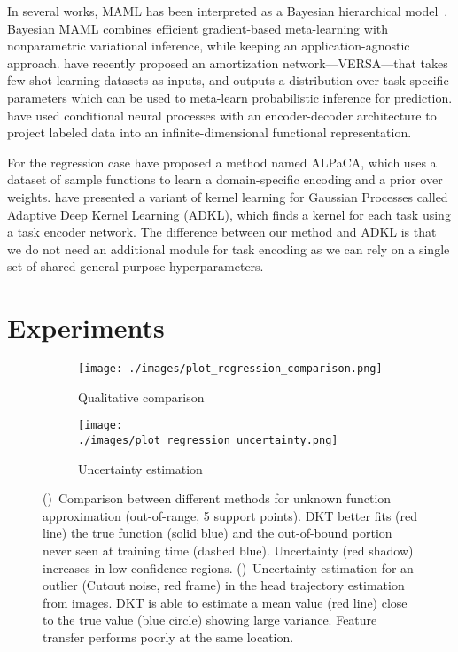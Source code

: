 \documentclass{article}
\begin{document}
In several works, MAML has been interpreted as a Bayesian hierarchical model~\citep{finn2018probabilistic, grant2018recasting, jerfel2019reconciling}. Bayesian MAML \citep{yoon2018bayesian} combines efficient gradient-based meta-learning with nonparametric variational inference, while keeping an application-agnostic approach. \citet{gordon2019meta} have recently proposed an amortization network---VERSA---that takes few-shot learning datasets as inputs, and outputs a distribution over task-specific parameters which can be used to meta-learn probabilistic inference for prediction. \cite{xu2019metafun} have used conditional neural processes with an encoder-decoder architecture to project labeled data into an infinite-dimensional functional representation.

For the regression case \cite{harrison2018meta} have proposed a method named ALPaCA, which uses a dataset of sample functions to learn a domain-specific encoding and a prior over weights. \citet{tossou2019adaptive} have presented a variant of kernel learning for Gaussian Processes called Adaptive Deep Kernel Learning (ADKL), which finds a kernel for each task using a task encoder network. The difference between our method and ADKL is that we do not need an additional module for task encoding as we can rely on a single set of shared general-purpose hyperparameters.

\section{Experiments}
\label{sec:experiments}

\begin{figure}[t!]
    \begin{subfigure}[t]{0.36\textwidth}
        \centering
        \texttt{[image: ./images/plot\_regression\_comparison.png]}
        \caption{Qualitative comparison}
        \label{fig:results-regression-comparison}
    \end{subfigure}
    \begin{subfigure}[t]{0.64\textwidth}
        \texttt{[image: ./images/plot\_regression\_uncertainty.png]}
        \caption{Uncertainty estimation}
        \label{fig:results-regression-uncertainty}
    \end{subfigure}
    \caption{()~Comparison between different methods for unknown function approximation (out-of-range, 5 support points). DKT better fits (red line) the true function (solid blue) and the out-of-bound portion never seen at training time (dashed blue). Uncertainty (red shadow) increases in low-confidence regions. ()~Uncertainty estimation for an outlier (Cutout noise, red frame) in the head trajectory estimation from images. DKT is able to estimate a mean value (red line) close to the true value (blue circle) showing large variance. Feature transfer performs poorly at the same location. }
    \label{fig_plot_regression_results}
\end{figure}
\end{document}
